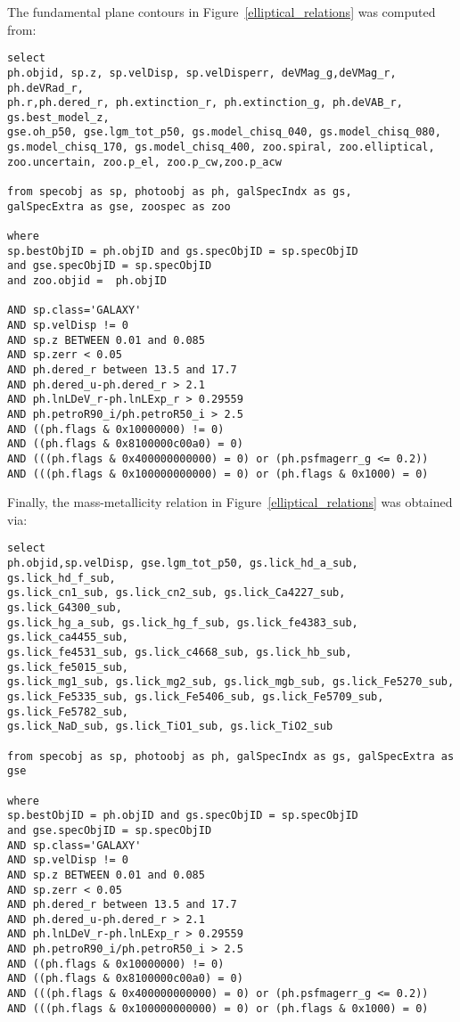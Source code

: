 \documentclass{emulateapj}
\begin{document}
The fundamental plane contours in Figure~\ref{elliptical_relations} was computed from:
\begin{verbatim}
select
ph.objid, sp.z, sp.velDisp, sp.velDisperr, deVMag_g,deVMag_r, ph.deVRad_r, 
ph.r,ph.dered_r, ph.extinction_r, ph.extinction_g, ph.deVAB_r,  gs.best_model_z, 
gse.oh_p50, gse.lgm_tot_p50, gs.model_chisq_040, gs.model_chisq_080, 
gs.model_chisq_170, gs.model_chisq_400, zoo.spiral, zoo.elliptical, 
zoo.uncertain, zoo.p_el, zoo.p_cw,zoo.p_acw 

from specobj as sp, photoobj as ph, galSpecIndx as gs, 
galSpecExtra as gse, zoospec as zoo

where
sp.bestObjID = ph.objID and gs.specObjID = sp.specObjID 
and gse.specObjID = sp.specObjID 
and zoo.objid =  ph.objID 

AND sp.class='GALAXY'
AND sp.velDisp != 0
AND sp.z BETWEEN 0.01 and 0.085
AND sp.zerr < 0.05
AND ph.dered_r between 13.5 and 17.7
AND ph.dered_u-ph.dered_r > 2.1
AND ph.lnLDeV_r-ph.lnLExp_r > 0.29559
AND ph.petroR90_i/ph.petroR50_i > 2.5
AND ((ph.flags & 0x10000000) != 0)
AND ((ph.flags & 0x8100000c00a0) = 0)
AND (((ph.flags & 0x400000000000) = 0) or (ph.psfmagerr_g <= 0.2))
AND (((ph.flags & 0x100000000000) = 0) or (ph.flags & 0x1000) = 0)
\end{verbatim}




Finally, the mass-metallicity relation in Figure~\ref{elliptical_relations} was obtained via:
\begin{verbatim}
select 
ph.objid,sp.velDisp, gse.lgm_tot_p50, gs.lick_hd_a_sub, gs.lick_hd_f_sub, 
gs.lick_cn1_sub, gs.lick_cn2_sub, gs.lick_Ca4227_sub, gs.lick_G4300_sub, 
gs.lick_hg_a_sub, gs.lick_hg_f_sub, gs.lick_fe4383_sub, gs.lick_ca4455_sub, 
gs.lick_fe4531_sub, gs.lick_c4668_sub, gs.lick_hb_sub, gs.lick_fe5015_sub, 
gs.lick_mg1_sub, gs.lick_mg2_sub, gs.lick_mgb_sub, gs.lick_Fe5270_sub, 
gs.lick_Fe5335_sub, gs.lick_Fe5406_sub, gs.lick_Fe5709_sub, gs.lick_Fe5782_sub, 
gs.lick_NaD_sub, gs.lick_TiO1_sub, gs.lick_TiO2_sub 

from specobj as sp, photoobj as ph, galSpecIndx as gs, galSpecExtra as gse

where
sp.bestObjID = ph.objID and gs.specObjID = sp.specObjID 
and gse.specObjID = sp.specObjID
AND sp.class='GALAXY'
AND sp.velDisp != 0
AND sp.z BETWEEN 0.01 and 0.085
AND sp.zerr < 0.05
AND ph.dered_r between 13.5 and 17.7
AND ph.dered_u-ph.dered_r > 2.1
AND ph.lnLDeV_r-ph.lnLExp_r > 0.29559
AND ph.petroR90_i/ph.petroR50_i > 2.5
AND ((ph.flags & 0x10000000) != 0)
AND ((ph.flags & 0x8100000c00a0) = 0)
AND (((ph.flags & 0x400000000000) = 0) or (ph.psfmagerr_g <= 0.2))
AND (((ph.flags & 0x100000000000) = 0) or (ph.flags & 0x1000) = 0)
\end{verbatim}
\end{document}
